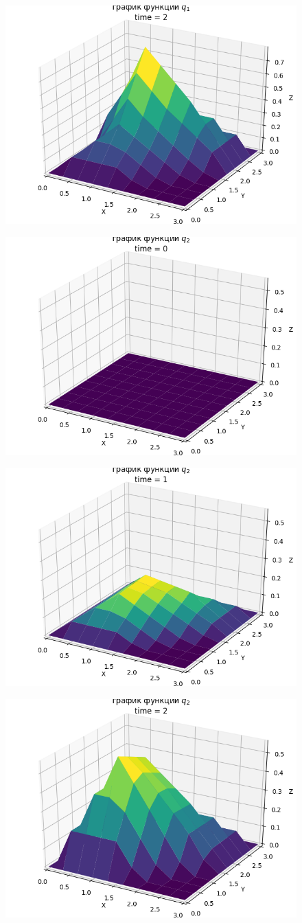 \documentclass[14pt]{extreport}
\begin{document}
\begin{figure}[H]
\centerline{
\includegraphics[width=0.5\linewidth]{images/ex1/q_1/2}}
\caption{}
\label{img:ex1:q1:2}
\end{figure}

\begin{figure}[H]
\centerline{
\includegraphics[width=0.5\linewidth]{images/ex1/q_2/0}}
\caption{}
\label{img:ex1:q2:0}
\end{figure}

\begin{figure}[H]
\centerline{
\includegraphics[width=0.5\linewidth]{images/ex1/q_2/1}}
\caption{}
\label{img:ex1:q2:1}
\end{figure}

\begin{figure}[H]
\centerline{
\includegraphics[width=0.5\linewidth]{images/ex1/q_2/2}}
\caption{}
\label{img:ex1:q2:2}
\end{figure}
\end{document}
